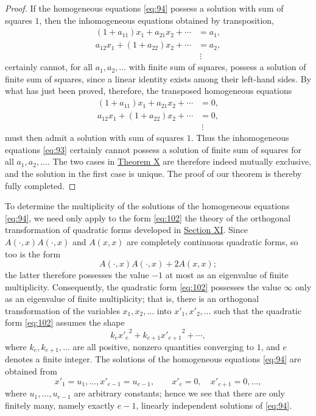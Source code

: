 \documentclass[b5paper,twoside]{article}
\newcommand{\originalpage}[1]{\phantomsection\label{origpage:#1}}
\begin{document}
\begin{proof}
If the homogeneous equations \eqref{eq:94} possess a solution with sum of
squares $1$, then the inhomogeneous equations obtained by transposition,
\begin{equation}
  \begin{aligned}
    (1+a_{11})x_1+a_{21}x_2+\cdots&=a_1,\\
    a_{12}x_1+(1+a_{22})x_2+\cdots&=a_2,\\
    &\ \vdots
  \end{aligned}
  \tag{104}\label{eq:104}
\end{equation}
certainly cannot, for all $a_1,a_2,\ldots$ with finite sum of squares,
possess a solution of finite sum of squares, since a linear identity exists
among their left-hand sides. By what has just been proved, therefore, the
transposed homogeneous equations
\begin{equation}
  \begin{aligned}
    (1+a_{11})x_1+a_{21}x_2+\cdots&=0,\\
    a_{12}x_1+(1+a_{22})x_2+\cdots&=0,\\
    &\ \vdots
  \end{aligned}
  \tag{105}\label{eq:105}
\end{equation}
must then admit a solution with sum of squares $1$. Thus the inhomogeneous
equations \eqref{eq:93} certainly cannot possess a solution of finite sum of
squares for all $a_1,a_2,\ldots$. The two cases in
\hyperref[thm:X]{Theorem X} are therefore indeed mutually exclusive, and the
solution in the first case is unique. The proof of our theorem is thereby
fully completed.
\end{proof}

To determine the multiplicity of the solutions of the homogeneous equations
\eqref{eq:94}, we need only apply to the form \eqref{eq:102} the theory of
the orthogonal transformation of quadratic forms developed in
\hyperref[sec:XI]{Section XI}. Since
$A(\mathord{\cdot},x)A(\mathord{\cdot},x)$ and $A(x,x)$ are completely
continuous quadratic forms, so too is the form
\[
  A(\mathord{\cdot},x)A(\mathord{\cdot},x)+2A(x,x);
\]
the latter therefore possesses the value $-1$ at most as an eigenvalue of
finite multiplicity. Consequently, the quadratic form \eqref{eq:102}
possesses the value $\infty$ only as an eigenvalue of finite multiplicity;
that is, there is an orthogonal transformation of the variables
\originalpage{223}
$x_1,x_2,\ldots$ into $x'_1,x'_2,\ldots$ such that the quadratic form
\eqref{eq:102} assumes the shape
\[
  k_e{x'_e}^{2}+k_{e+1}{x'_{e+1}}^{2}+\cdots,
\]
where $k_e,k_{e+1},\ldots$ are all positive, nonzero quantities converging
to $1$, and $e$ denotes a finite integer. The solutions of the homogeneous
equations \eqref{eq:94} are obtained from
\[
  x'_1=u_1,\ldots,x'_{e-1}=u_{e-1},\qquad
  x'_e=0,\quad x'_{e+1}=0,\ldots,
\]
where $u_1,\ldots,u_{e-1}$ are arbitrary constants; hence we see that there
are only finitely many, namely exactly $e-1$, linearly independent solutions
of \eqref{eq:94}.
\end{document}
